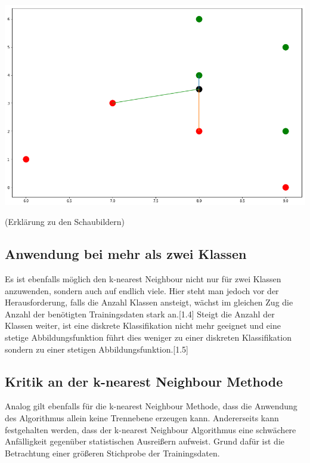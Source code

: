 \documentclass[fontsize=11pt]{scrartcl}
\newenvironment{Figure}
  {\par\medskip\noindent\minipage{\linewidth}}
  {\endminipage\par\medskip}
\begin{document}
\begin{Figure}
\begin{minipage}[b]{.4\linewidth}
                        \includegraphics[scale=0.2]{knn4.png}
                    \end{minipage}
                \end{Figure}     
                
                        
                (Erklärung zu den Schaubildern)
                        
            \subsection{Anwendung bei mehr als zwei Klassen}
                Es ist ebenfalls möglich den k-nearest Neighbour nicht nur für zwei Klassen anzuwenden, sondern auch auf endlich viele. Hier steht man jedoch vor der Herausforderung, falls die Anzahl Klassen ansteigt, wächst im gleichen Zug die Anzahl der benötigten Trainingsdaten stark an.[1.4]
                Steigt die Anzahl der Klassen weiter, ist eine diskrete Klassifikation nicht mehr geeignet und eine stetige Abbildungsfunktion   führt dies weniger zu einer diskreten Klassifikation sondern zu einer stetigen Abbildungsfunktion.[1.5]
                
            \subsection{Kritik an der k-nearest Neighbour Methode}
                Analog gilt ebenfalls für die k-nearest Neighbour Methode, dass die Anwendung des Algorithmus allein keine Trennebene erzeugen kann.
                Andererseits kann festgehalten werden, dass der k-nearest Neighbour Algorithmus eine schwächere Anfälligkeit gegenüber statistischen Ausreißern aufweist. Grund dafür ist die Betrachtung einer größeren Stichprobe der Trainingsdaten.
                        
\end{document}
